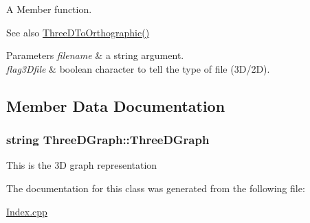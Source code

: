 A Member function. 

\begin{DoxySeeAlso}{See also}
\hyperlink{classThreeDGraph_a7f484956c7d616b6724e758ed43e5bed}{Three\+D\+To\+Orthographic()} 
\end{DoxySeeAlso}

\begin{DoxyParams}{Parameters}
{\em filename} & a string argument. \\
\hline
{\em flag3\+Dfile} & boolean character to tell the type of file (3\+D/2D). \\
\hline
\end{DoxyParams}


\subsection{Member Data Documentation}
\subsubsection[{\texorpdfstring{Three\+D\+Graph}{ThreeDGraph}}]{\setlength{\rightskip}{0pt plus 5cm}string Three\+D\+Graph\+::\+Three\+D\+Graph}\hypertarget{classThreeDGraph_ab2553252d92e1a3e81e58b81ef95220a}{}\label{classThreeDGraph_ab2553252d92e1a3e81e58b81ef95220a}
This is the 3D graph representation 

The documentation for this class was generated from the following file\+:\begin{DoxyCompactItemize}
\item 
\hyperlink{Index_8cpp}{Index.\+cpp}\end{DoxyCompactItemize}
